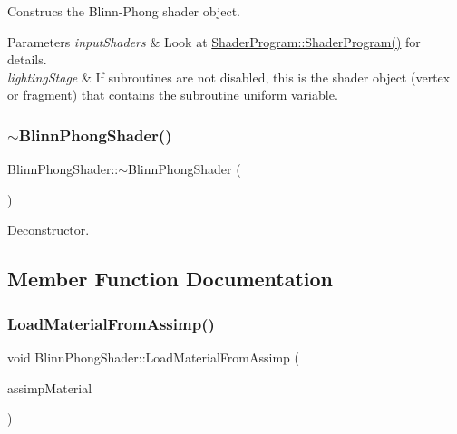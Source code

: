 Construcs the Blinn-\/\+Phong shader object.


\begin{DoxyParams}{Parameters}
{\em input\+Shaders} & Look at \hyperlink{class_shader_program_aba2db5734b2f70cc34078126ad279588}{Shader\+Program\+::\+Shader\+Program()} for details. \\
\hline
{\em lighting\+Stage} & If subroutines are not disabled, this is the shader object (vertex or fragment) that contains the subroutine uniform variable. \\
\hline
\end{DoxyParams}
\hypertarget{class_blinn_phong_shader_a5d7a46de957e0676ed4ceb00f7399a39}{}\label{class_blinn_phong_shader_a5d7a46de957e0676ed4ceb00f7399a39}
\subsubsection{\texorpdfstring{$\sim$\+Blinn\+Phong\+Shader()}{~BlinnPhongShader()}}
{\footnotesize\ttfamily Blinn\+Phong\+Shader\+::$\sim$\+Blinn\+Phong\+Shader (\begin{DoxyParamCaption}{ }\end{DoxyParamCaption})\hspace{0.3cm}{\ttfamily [virtual]}}



Deconstructor.



\subsection{Member Function Documentation}
\hypertarget{class_blinn_phong_shader_a5a2a720a403f3d005b07a96fee35b95b}{}\label{class_blinn_phong_shader_a5a2a720a403f3d005b07a96fee35b95b}
\subsubsection{\texorpdfstring{Load\+Material\+From\+Assimp()}{LoadMaterialFromAssimp()}}
{\footnotesize\ttfamily void Blinn\+Phong\+Shader\+::\+Load\+Material\+From\+Assimp (\begin{DoxyParamCaption}\item[{std\+::shared\+\_\+ptr$<$ struct ai\+Material $>$}]{assimp\+Material }\end{DoxyParamCaption})\hspace{0.3cm}{\ttfamily [virtual]}}



